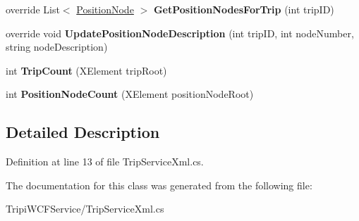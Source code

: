 \begin{DoxyCompactItemize}
\item 
\hypertarget{class_tripi_w_c_f_1_1_service_1_1_trip_service_xml_a994a5112e313ad9bb7c9769634bbc7dd}{
override List$<$ \hyperlink{class_tripi_w_c_f_1_1_service_1_1_position_node}{PositionNode} $>$ {\bfseries GetPositionNodesForTrip} (int tripID)}
\label{class_tripi_w_c_f_1_1_service_1_1_trip_service_xml_a994a5112e313ad9bb7c9769634bbc7dd}

\item 
\hypertarget{class_tripi_w_c_f_1_1_service_1_1_trip_service_xml_a6f84d50e2e82315ccf10b0ac9309e1a0}{
override void {\bfseries UpdatePositionNodeDescription} (int tripID, int nodeNumber, string nodeDescription)}
\label{class_tripi_w_c_f_1_1_service_1_1_trip_service_xml_a6f84d50e2e82315ccf10b0ac9309e1a0}

\item 
\hypertarget{class_tripi_w_c_f_1_1_service_1_1_trip_service_xml_a65813ff3d23b8cb398eecb0d2f8a8d48}{
int {\bfseries TripCount} (XElement tripRoot)}
\label{class_tripi_w_c_f_1_1_service_1_1_trip_service_xml_a65813ff3d23b8cb398eecb0d2f8a8d48}

\item 
\hypertarget{class_tripi_w_c_f_1_1_service_1_1_trip_service_xml_a441563fbd0ce03738c422f3b71dcde9a}{
int {\bfseries PositionNodeCount} (XElement positionNodeRoot)}
\label{class_tripi_w_c_f_1_1_service_1_1_trip_service_xml_a441563fbd0ce03738c422f3b71dcde9a}

\end{DoxyCompactItemize}


\subsection{Detailed Description}


Definition at line 13 of file TripServiceXml.cs.

The documentation for this class was generated from the following file:\begin{DoxyCompactItemize}
\item 
TripiWCFService/TripServiceXml.cs\end{DoxyCompactItemize}
